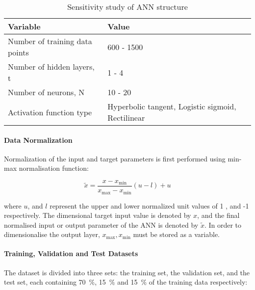 \begin{table*}
	\caption{Sensitivity study of ANN structure}
	\label{Sensitivity study of ANN structure}
	\centering
	\renewcommand{\arraystretch}{1.5}%
	\begin{tabular}{|P{0.4\textwidth}|P{0.4\textwidth}|}
		\hline
		\textbf{Variable} & \textbf{Value} \\ [0.5ex]
		\hline
		Number of training data points & 600 - 1500 \\ [0.5ex]
		\hline
		Number of hidden layers, t & 1 - 4 \\ [0.5ex]
		\hline
		Number of neurons, N & 10 - 20 \\ [0.5ex]
	    \hline
		Activation function type & Hyperbolic tangent, Logistic sigmoid, Rectilinear \\ [0.5ex]
		\hline
	\end{tabular}
\end{table*}

\paragraph{Data Normalization}

Normalization of the input and target parameters is first performed using min-max normalisation function:

\begin{equation}
	\tilde{x}=\frac{x-x_{\min }}{x_{\max }-x_{\min }}(u-l)+u
\end{equation}

where $u$, and $l$ represent the upper and lower normalized unit values of 1 , and -1 respectively. The dimensional target input value is denoted by $x$, and the final normalised input or output parameter of the ANN is denoted by $\tilde{x}$. In order to dimensionalise the output layer, $x_{\max }, x_{\min }$ must be stored as a variable.

\paragraph{Training, Validation and Test Datasets}

The dataset is divided into three sets: the training set, the validation set, and the test set, each containing 70~$\%$, 15~$\%$ and 15~$\%$ of the training data respectively:

